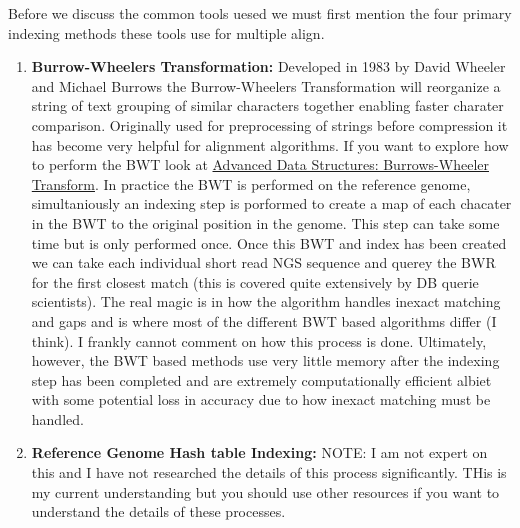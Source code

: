 \documentclass{article}
\begin{document}
    Before we discuss the common tools uesed we must first mention the four primary indexing methods these tools use for multiple align.
    \begin{enumerate}
        \item \textbf{Burrow-Wheelers Transformation:} Developed in 1983 by David Wheeler and Michael Burrows the Burrow-Wheelers Transformation will reorganize a string of text grouping of similar characters together enabling faster charater comparison.   Originally used for preprocessing of strings before compression it has become very helpful for alignment algorithms. If you want to explore how to perform the BWT look at \href{https://www.youtube.com/watch?v=Lc-ACiJIrnM}{Advanced Data Structures: Burrows-Wheeler Transform}. In practice the BWT is performed on the reference genome, simultaniously an indexing step is porformed to create a map of each chacater in the BWT to the original position in the genome.  This step can take some time but is only performed once.   Once this BWT and index has been created we can take each individual short read NGS sequence and querey the BWR for the first closest match (this is covered quite extensively by DB querie scientists). The real magic is in how the algorithm handles inexact matching and gaps and is where most of the different BWT based algorithms differ (I think).  I frankly cannot comment on how this process is done. Ultimately, however, the BWT based methods use very little memory after the indexing step has been completed and are extremely computationally efficient albiet with some potential loss in accuracy due to how inexact matching must be handled.

        \item \textbf{Reference Genome Hash table Indexing:} NOTE: I am not expert on this and I have not researched the details of this process significantly.  THis is my current understanding but you should use other resources if you want to understand the details of these processes. 
            

\end{enumerate}
\end{document}
